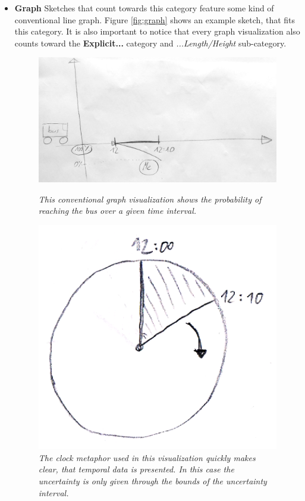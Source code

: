 \begin{itemize}
	\item \textbf{Graph} Sketches that count towards this category feature some kind of conventional line graph. Figure \ref{fig:graph} shows an example sketch, that fits this category. It is also important to notice that every graph visualization also counts toward the \textbf{Explicit...} category and \textit{...Length/Height} sub-category.
	
	\begin{figure}[H]
		\begin{minipage}{.5\textwidth}
			\centering
			\captionsetup{width=0.8\textwidth}
			\includegraphics[height=0.5\textwidth]{figures/graph.jpg}
			\caption{\textit{This conventional graph visualization shows the probability of reaching the bus over a given time interval.}}
			\label{fig:graph}
		\end{minipage}
		\begin{minipage}{.45\textwidth}
			\centering
			\captionsetup{width=1.0\textwidth}
			\includegraphics[height=0.5\textwidth]{figures/clock.png}
			\caption{\textit{The clock metaphor used in this visualization quickly makes clear, that temporal data is presented. In this case the uncertainty is only given through the bounds of the uncertainty interval.}}
			\label{fig:clock}
		\end{minipage}
	\end{figure}
	

\end{itemize}
